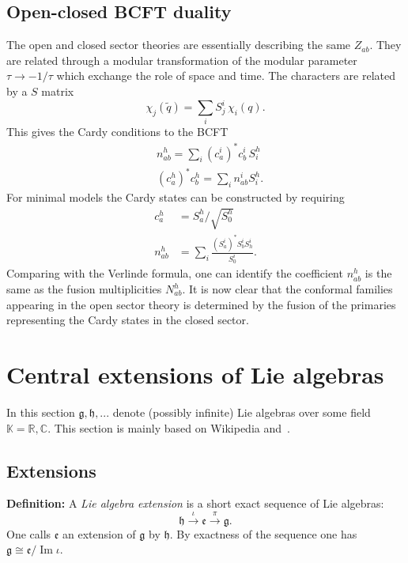 \documentclass[submission, PhysLectNotes]{SciPost}
\DeclareMathOperator{\Ima}{Im}
\begin{document}
\subsection{Open-closed BCFT duality}
The open and closed sector theories are essentially describing the same $Z_{ab}$. They are related through a modular transformation of the modular parameter $\tau \rightarrow -1/\tau$ which exchange the role of space and time. The characters are related by a $S$ matrix 
\begin{equation}
    \chi_j(\tilde{q}) = \sum_i S^i_j\, \chi_i(q).
\end{equation}
This gives the Cardy conditions to the BCFT
\begin{equation}
\begin{split}
    & n_{ab}^h = \sum_i \left(c_a^i\right)^* c_b^i\, S_i^h \\
    & \left(c_a^h\right)^* c_b^h = \sum_i n_{ab}^i S^h_i.  
\end{split}
\end{equation}
For minimal models the Cardy states can be constructed by requiring
\begin{equation}
\begin{split}
    c_a^h &= S_a^h / \sqrt{S^h_0} \\
    n_{ab}^h &= \sum_i \frac{\left(S_a^i\right)^* S_b^i S_h^i}{S_0^i}.
\end{split}
\end{equation}
Comparing with the Verlinde formula, one can identify the coefficient $n_{ab}^h$ is the same as the fusion multiplicities $N_{ab}^h$. It is now clear that the conformal families appearing in the open sector theory is determined by the fusion of the primaries representing the Cardy states in the closed sector. 

\appendix

\section{Central extensions of Lie algebras}
In this section $\mathfrak{g},\mathfrak{h},...$ denote (possibly infinite) Lie algebras over some field $\mathbb{K} = \mathbb{R}, \mathbb{C}$. This section is mainly based on Wikipedia and~\cite{Schottenloher}.
\subsection{Extensions}
{\bf Definition:} A \emph{Lie algebra extension} is a short exact sequence of Lie algebras:
\begin{equation}
	\mathfrak{h}\overset{\iota}{\rightarrow}\mathfrak{e}\overset{\pi}{\rightarrow}\mathfrak{g}.
\end{equation}
One calls $\mathfrak{e}$ an extension of $\mathfrak{g}$ by $\mathfrak{h}$. By exactness of the sequence one has $\mathfrak{g}\cong\mathfrak{e}\slash\Ima\iota$.\\
\end{document}

